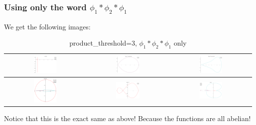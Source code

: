 \documentclass[a4paper,10pt]{article}
\begin{document}
 \subsubsection{Using only the word $\phi_1*\phi_2*\phi_1$}
 We get the following images:
 \begin{table}[!ht]
 \caption{product\_threshold=3, $\phi_1*\phi_2*\phi_1$ only}
 \begin{tabular}{|c|c|c|}
  \hline
  \includegraphics[width=0.3\textwidth]{PT_3_z1_1-1_2-1_1-1.png} &
  \includegraphics[width=0.3\textwidth]{PT_3_C1z1_1-1_2-1_1-1.png} &
  \includegraphics[width=0.3\textwidth]{PT_3_C2z1_1-1_2-1_1-1.png} \\ \hline
  \includegraphics[width=0.3\textwidth]{PT_3_z2_1-1_2-1_1-1.png} &
  \includegraphics[width=0.3\textwidth]{PT_3_zed_C0_1-1_2-1_1-1.png} &
  \includegraphics[width=0.3\textwidth]{PT_3_zed_1-1_2-1_1-1.png} \\ \hline
 \end{tabular}
 \end{table}
 Notice that this is the exact same as above! Because the functions are all abelian!
\end{document}
